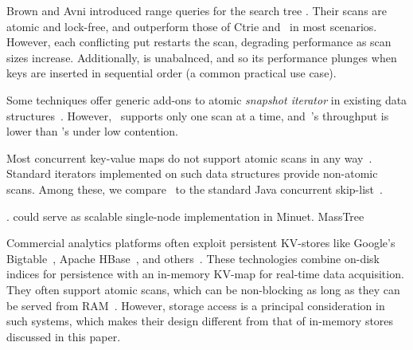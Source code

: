
Brown and Avni \cite{BrownA12} introduced range queries for the \kary search tree \cite{kary}.
Their scans are atomic and lock-free, and outperform those  of Ctrie and \snaptree\ in most scenarios.
However, each conflicting put restarts the scan,
degrading performance as scan sizes increase. Additionally,
\kary is unabalnced, and so its performance plunges when keys are inserted in sequential order
(a common practical use case).

Some techniques offer generic add-ons to atomic \emph{snapshot iterator} in existing data structures~\cite{Petrank2013, wttm2016}.
However,~\cite{Petrank2013} supports only one scan at a time, and~\cite{wttm2016}'s throughput is lower than \kary's under low contention. 

Most concurrent key-value maps do not support atomic  scans in any
way~\cite{JavaConcurrentSkipList,LinkedListBP,BraginskyP2012,Hendler04,NatarajanM2014,Kogan12,Lomet13}.
Standard iterators implemented on such data structures provide non-atomic scans. Among these, we compare \kiwi\ to the standard Java 
concurrent skip-list~\cite{Fraser04}.

{. {\kiwi} could serve as scalable single-node implementation in Minuet.} MassTree~\cite{Mao:2012}

Commercial analytics platforms often exploit persistent KV-stores like Google's Bigtable~\cite{Chang2008},
Apache HBase~\cite{ApacheHBase}, and others~\cite{leveldb, RocksDB}. 
These technologies combine on-disk indices for persistence with an in-memory KV-map for real-time data acquisition.
They often support atomic scans, which can be non-blocking as long as they can be served from RAM~\cite{GolanGueta2015}. 
However, storage access is a principal consideration in such systems, which makes their design different from that 
of in-memory stores discussed in this paper.


